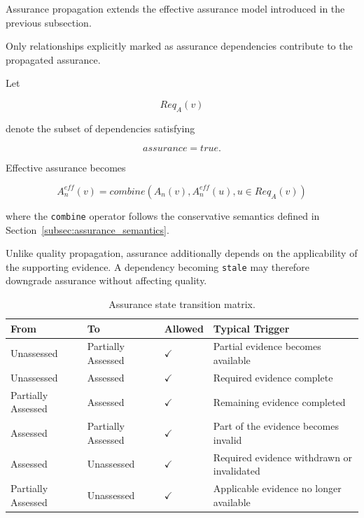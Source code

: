\documentclass[10pt]{article}
\begin{document}
Assurance propagation extends the effective assurance model introduced in the
previous subsection.

Only relationships explicitly marked as assurance dependencies contribute to
the propagated assurance.

Let

\[
Req_A(v)
\]

denote the subset of dependencies satisfying

\[
assurance=true.
\]

Effective assurance becomes

\begin{equation}
	A_n^{eff}(v)
	=
	combine
	\left(
	A_n(v),
	A_n^{eff}(u),
	u\in Req_A(v)
	\right)
	\label{eq:assurance_propagation}
\end{equation}

where the
\texttt{combine}
operator follows the conservative semantics defined in
Section~\ref{subsec:assurance_semantics}.

Unlike quality propagation, assurance additionally depends on the applicability
of the supporting evidence. A dependency becoming
\texttt{stale}
may therefore downgrade assurance without affecting quality.

\begin{table}[ht]
	\caption{Assurance state transition matrix.}
	\label{tab:assurance_transition_matrix}
	\centering
	\small
	\begin{tabular}{llll}
		\toprule
		\textbf{From} & \textbf{To} & \textbf{Allowed} & \textbf{Typical Trigger} \\
		\midrule
		Unassessed & Partially Assessed & $\checkmark$ & Partial evidence becomes available \\
		Unassessed & Assessed & $\checkmark$ & Required evidence complete \\
		Partially Assessed & Assessed & $\checkmark$ & Remaining evidence completed \\
		Assessed & Partially Assessed & $\checkmark$ & Part of the evidence becomes invalid \\
		Assessed & Unassessed & $\checkmark$ & Required evidence withdrawn or invalidated \\
		Partially Assessed & Unassessed & $\checkmark$ & Applicable evidence no longer available \\
		\bottomrule
	\end{tabular}
\end{table}

\end{document}
